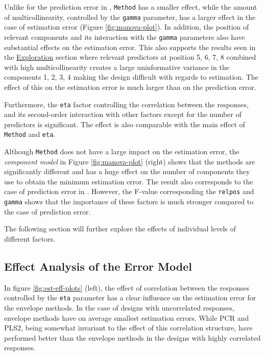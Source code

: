 \documentclass[12pt,3p,authoryear]{elsarticle}
\providecommand{\tightlist}{%
  \setlength{\itemsep}{0pt}\setlength{\parskip}{0pt}}
\begin{document}
\begin{description}
\tightlist
\item[\textbf{Error Model:}]
Unlike for the prediction error in \citet{rimal2019pred}, \texttt{Method} has a smaller effect, while the amount of multicollinearity, controlled by the \texttt{gamma} parameter, has a larger effect in the case of estimation error (Figure \ref{fig:manova-plot}). In addition, the position of relevant components and its interaction with the \texttt{gamma} parameters also have substantial effects on the estimation error. This also supports the results seen in the \protect\hyperlink{exploration}{Exploration} section where relevant predictors at position 5, 6, 7, 8 combined with high multicollinearity creates a large uninformative variance in the components 1, 2, 3, 4 making the design difficult with regards to estimation. The effect of this on the estimation error is much larger than on the prediction error.

Furthermore, the \texttt{eta} factor controlling the correlation between the responses, and its second-order interaction with other factors except for the number of predictors is significant. The effect is also comparable with the main effect of \texttt{Method} and \texttt{eta}.
\item[\textbf{Component Model:}]
Although \texttt{Method} does not have a large impact on the estimation error, the \emph{component model} in Figure \ref{fig:manova-plot} (right) shows that the methods are significantly different and has a huge effect on the number of components they use to obtain the minimum estimation error. The result also corresponds to the case of prediction error in \citet{rimal2019pred}. However, the F-value corresponding the \texttt{relpos} and \texttt{gamma} shows that the importance of these factors is much stronger compared to the case of prediction error.
\end{description}

The following section will further explore the effects of individual levels of different factors.

\hypertarget{effect-analysis-of-the-error-model}{%
\subsection{Effect Analysis of the Error Model}\label{effect-analysis-of-the-error-model}}

In figure \ref{fig:est-eff-plots} (left), the effect of correlation between the responses controlled by the \texttt{eta} parameter has a clear influence on the estimation error for the envelope methods. In the case of designs with uncorrelated responses, envelope methods have on average smallest estimation errors. While PCR and PLS2, being somewhat invariant to the effect of this correlation structure, have performed better than the envelope methods in the designs with highly correlated responses.
\end{document}
